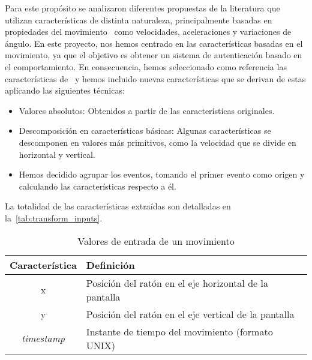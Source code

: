 Para este propósito se analizaron diferentes propuestas de la literatura que utilizan características de distinta naturaleza, principalmente basadas en propiedades del movimiento~\cite{sayed2013,zheng2011,gamboa2003} como velocidades, aceleraciones y variaciones de ángulo. En este proyecto, nos hemos centrado en las características basadas en el movimiento, ya que el objetivo es obtener un sistema de autenticación basado en el comportamiento. En consecuencia, hemos seleccionado como referencia las características de~\cite{gamboa2003} y  hemos incluido nuevas características que se derivan de estas aplicando las siguientes técnicas:
\begin{itemize}
    \item Valores absolutos: Obtenidos a partir de las características originales.
    \item Descomposición en características básicas: Algunas características se descomponen en valores más primitivos, como la velocidad que se divide en horizontal y vertical.
    \item Hemos decidido agrupar los eventos, tomando el primer evento como origen y calculando las características respecto a él.
\end{itemize}

La totalidad de las características extraídas son detalladas en la~\cref{tab:transform_inputs}.


\begin{table}[htbp!]
    \centering
    \begin{tabular}{ c  l }
        \toprule
        \textbf{Característica} & \textbf{Definición}                                    \\
        \midrule \midrule
        x                       & Posición del ratón en el eje horizontal de la pantalla \\
        
        y                       & Posición del ratón en el eje vertical de la pantalla   \\
        
        \textit{timestamp}               & Instante de tiempo del movimiento (formato UNIX)       \\
        \bottomrule
    \end{tabular}
    \caption{\label{tab:raw_inputs}Valores de entrada de un movimiento}
\end{table}




